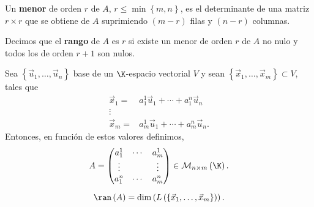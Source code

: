 \begin{fdefinition}[Menor]
	\normalfont Un \textbf{menor} de orden $\displaystyle r $ de $\displaystyle A $, $\displaystyle r \leq \min \left\{ m,n\right\}  $, es el determinante de una matriz $\displaystyle r \times r $ que se obtiene de $\displaystyle A $ suprimiendo $\displaystyle \left(m - r\right) $ filas y $\displaystyle \left(n - r\right) $ columnas. 
\end{fdefinition}

\begin{fdefinition}[Rango]
\normalfont Decimos que el \textbf{rango} de $\displaystyle A $ es $\displaystyle r $ si existe un menor de orden $\displaystyle r $ de $\displaystyle A $ no nulo y todos los de orden $\displaystyle r+1 $ son nulos.
\end{fdefinition}
Sea $\displaystyle \left\{ \vec{u}_{1}, \ldots, \vec{u}_{n}\right\}  $ base de un $\displaystyle \K $-espacio vectorial $\displaystyle V $ y sean $\displaystyle \left\{ \vec{x}_{1}, \ldots, \vec{x}_{m}\right\} \subset V $, tales que
\[
\begin{split}
	\vec{x}_{1} = & a^{1}_{1}\vec{u}_{1} + \cdots + a^{n}_{1}\vec{u}_{n} \\
	\vdots & \\
	\vec{x}_{m} = & a^{1}_{m}\vec{u}_{1} + \cdots + a^{n}_{m}\vec{u}_{n}.
\end{split}
\]
Entonces, en función de estos valores definimos,
\[A = \begin{pmatrix} a^{1}_{1} & \cdots & a^{1}_{m}\\
\vdots & & \vdots \\
a^{n}_{1} & \cdots & a^{n}_{m}\end{pmatrix} \in \mathcal{M}_{n \times m}\left(\K\right) .\]
\begin{ftheorem}[]
\normalfont 
\[\ran\left(A\right) = \dim\left(L\left( \left\{ \vec{x}_{1}, \ldots, \vec{x}_{m}\right\} \right)\right) .\]
\end{ftheorem}
